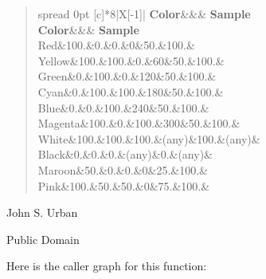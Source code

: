 \begin{DoxyDescription}
\begin{quote}
\tabulinesep=1mm
\begin{longtabu} spread 0pt [c]{*{8}{|X[-1]}|}
\hline
\rowcolor{\tableheadbgcolor}\textbf{ Color}&&&\textbf{ Sample }\\
\endfirsthead
\hline
\endfoot
\hline
\rowcolor{\tableheadbgcolor}\textbf{ Color}&&&\textbf{ Sample }\\
\endhead
Red&100.&0.&0.&0&50.&100.&~ \\
Yellow&100.&100.&0.&60&50.&100.&~ \\
Green&0.&100.&0.&120&50.&100.&~ \\
Cyan&0.&100.&100.&180&50.&100.&~ \\
Blue&0.&0.&100.&240&50.&100.&~ \\
Magenta&100.&0.&100.&300&50.&100.&~ \\
White&100.&100.&100.&(any)&100.&(any)&~ \\
Black&0.&0.&0.&(any)&0.&(any)&~ \\
Maroon&50.&0.&0.&0&25.&100.&~ \\
Pink&100.&50.&50.&0&75.&100.&~ \\
\end{longtabu}
\end{quote}



\item[A\+U\+T\+H\+OR ]

John S. Urban




\item[L\+I\+C\+E\+N\+SE ]

Public Domain




\end{DoxyDescription}Here is the caller graph for this function\+:\nopagebreak
